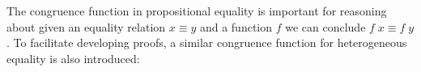 \documentclass{l4proj}
\begin{document}
The congruence function in propositional equality is important for reasoning about given an equality relation $x \equiv y$ and a function $f$ we can conclude $f\; x \equiv f\; y $. To facilitate developing proofs, a similar congruence function for heterogeneous equality is also introduced:
\begin{code}%
\>[0]\AgdaSpace{}%
\AgdaSymbol{:}%
\>[113I]\AgdaSymbol{\{}\AgdaSpace{}%
\AgdaSpace{}%
\AgdaSpace{}%
\AgdaSymbol{:}\AgdaSpace{}%
\AgdaSymbol{\}}\AgdaSpace{}%
\AgdaSymbol{\{}\AgdaSpace{}%
\AgdaSymbol{:}\AgdaSpace{}%
\AgdaSpace{}%
\AgdaSymbol{\}}\AgdaSpace{}%
\AgdaSymbol{\{}\AgdaSpace{}%
\AgdaSpace{}%
\AgdaSymbol{:}\AgdaSpace{}%
\AgdaSymbol{\}}\<%
\\
\>[.][@{}l@{}]\<[113I]%
\>[9]\AgdaSpace{}%
\AgdaSymbol{(}\AgdaSpace{}%
\AgdaSymbol{:}\AgdaSpace{}%
\AgdaSpace{}%
\AgdaSpace{}%
\AgdaSpace{}%
\AgdaSymbol{)}\AgdaSpace{}%
\AgdaSymbol{\{}\AgdaSpace{}%
\AgdaSymbol{:}\AgdaSpace{}%
\AgdaSymbol{\{}\AgdaSpace{}%
\AgdaSymbol{:}\AgdaSpace{}%
\AgdaSymbol{\}}\AgdaSpace{}%
\AgdaSpace{}%
\AgdaSpace{}%
\AgdaSpace{}%
\AgdaSpace{}%
\AgdaSpace{}%
\AgdaSymbol{\}}\AgdaSpace{}%
\AgdaSymbol{\{}\AgdaSpace{}%
\AgdaSymbol{:}\AgdaSpace{}%
\AgdaSpace{}%
\AgdaSymbol{\}}\AgdaSpace{}%
\AgdaSymbol{\{}\AgdaSpace{}%
\AgdaSymbol{:}\AgdaSpace{}%
\AgdaSpace{}%
\AgdaSymbol{\}}\<%
\\
%
\>[9]\AgdaSpace{}%
\AgdaSpace{}%
\AgdaSpace{}%
\<%
\\
%
\>[9]\AgdaSpace{}%
\AgdaSymbol{(}\AgdaSpace{}%
\AgdaSymbol{:}\AgdaSpace{}%
\AgdaSymbol{\{}\AgdaSpace{}%
\AgdaSymbol{:}\AgdaSpace{}%
\AgdaSymbol{\}}\AgdaSpace{}%
\AgdaSpace{}%
\AgdaSymbol{(}\AgdaSpace{}%
\AgdaSymbol{:}\AgdaSpace{}%
\AgdaSpace{}%
\AgdaSymbol{)}\AgdaSpace{}%
\AgdaSpace{}%
\AgdaSpace{}%
\AgdaSymbol{)}\<%
\\
%
\>[9]\AgdaSpace{}%
\AgdaSpace{}%
\AgdaSpace{}%
\<%
\\
%
\>[9]\AgdaSpace{}%
\AgdaSpace{}%
\AgdaSpace{}%
\AgdaSpace{}%
\AgdaSpace{}%
\<%
\\
\>[0]\AgdaSpace{}%
\AgdaSymbol{\AgdaUnderscore{}}\AgdaSpace{}%
\AgdaSpace{}%
\AgdaSymbol{\AgdaUnderscore{}}\AgdaSpace{}%
\AgdaSpace{}%
\AgdaSymbol{=}\AgdaSpace{}%
\<%
\end{code}
\end{document}
